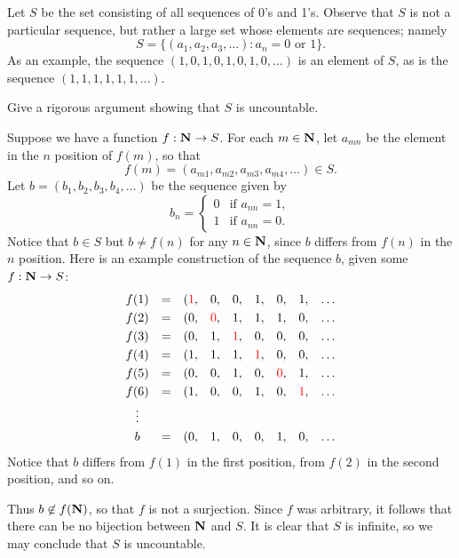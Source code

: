 \documentclass{lew98_solutions}
\begin{document}
\begin{exercise}
\label{ex:1.6.4}
    Let \( S \) be the set consisting of all sequences of 0's and 1's. Observe that \( S \) is not a particular sequence, but rather a large set whose elements are sequences; namely
    \[
        S = \{ (a_1, a_2, a_3, \ldots) : a_n = 0 \text{ or } 1 \}.
    \]
    As an example, the sequence \( (1, 0, 1, 0, 1, 0, 1, 0, \ldots) \) is an element of \( S \), as is the sequence \( (1, 1, 1, 1, 1, 1, \ldots) \).

    Give a rigorous argument showing that \( S \) is uncountable.
\end{exercise}

\begin{solution}
    Suppose we have a function \( f : \mathbf{N} \to S \). For each \( m \in \mathbf{N} \), let \( a_{mn} \) be the element in the \( n \) position of \( f(m) \), so that
    \[
        f(m) = (a_{m1}, a_{m2}, a_{m3}, a_{m4}, \ldots) \in S.
    \]
    Let \( b = (b_1, b_2, b_3, b_4, \ldots) \) be the sequence given by
    \[
        b_n = \begin{cases}
            0 & \text{if } a_{nn} = 1, \\
            1 & \text{if } a_{nn} = 0.
        \end{cases}
    \]
    Notice that \( b \in S \) but \( b \neq f(n) \) for any \( n \in \mathbf{N} \), since \( b \) differs from \( f(n) \) in the \( n \) position. Here is an example construction of the sequence \( b \), given some \( f : \mathbf{N} \to S \):
    \[
        \begin{matrix}
            f(1) & = & (\textcolor{red}{1}, & 0, & 0, & 1, & 0, & 1, & \ldots \\[1mm]
            f(2) & = & (0, & \textcolor{red}{0}, & 1, & 1, & 1, & 0, & \ldots \\[1mm]
            f(3) & = & (0, & 1, & \textcolor{red}{1}, & 0, & 0, & 0, & \ldots \\[1mm]
            f(4) & = & (1, & 1, & 1, & \textcolor{red}{1}, & 0, & 0, & \ldots \\[1mm]
            f(5) & = & (0, & 0, & 1, & 0, & \textcolor{red}{0}, & 1, & \ldots \\[1mm]
            f(6) & = & (1, & 0, & 0, & 1, & 0, & \textcolor{red}{1}, & \ldots \\[1mm]
            \vdots & & & & & & & & \\[1mm]
            b & = & (0, & 1, & 0, & 0, & 1, & 0, & \ldots
        \end{matrix}
    \]
    Notice that \( b \) differs from \( f(1) \) in the first position, from \( f(2) \) in the second position, and so on.

    Thus \( b \not\in f(\mathbf{N}) \), so that \( f \) is not a surjection. Since \( f \) was arbitrary, it follows that there can be no bijection between \( \mathbf{N} \) and \( S \). It is clear that \( S \) is infinite, so we may conclude that \( S \) is uncountable.
\end{solution}
\end{document}
